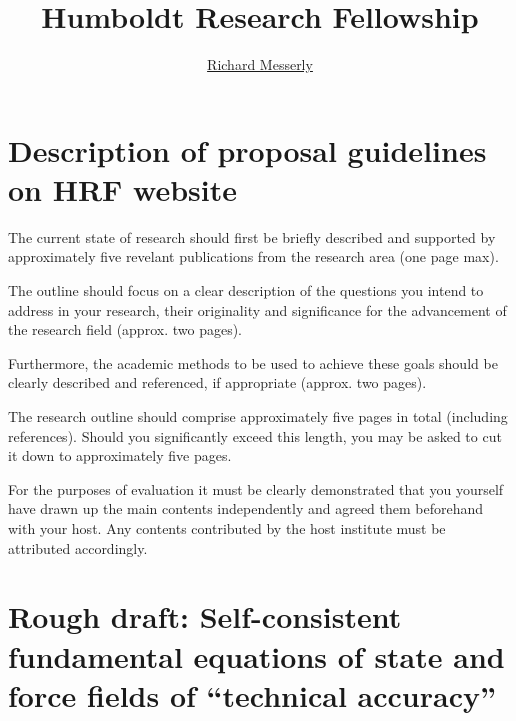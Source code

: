 \documentclass[11pt,a4paper]{article}
\begin{document}
	\thispagestyle{empty}
	\title{\Large \textbf{Humboldt Research Fellowship}}
	\author[1]{\large {\underline{Richard Messerly}}}%
	
	
	\date{} %
	\maketitle\thispagestyle{empty} %
	\justify

\section*{Description of proposal guidelines on HRF website}

The current state of research should first be briefly described and supported by approximately five revelant publications from the research area (one page max).

The outline should focus on a clear description of the questions you intend to address in your research, their originality and significance for the advancement of the research field (approx. two pages).

Furthermore, the academic methods to be used to achieve these goals should be clearly described and referenced, if appropriate (approx. two pages).

The research outline should comprise approximately five pages in total (including references). Should you significantly exceed this length, you may be asked to cut it down to approximately five pages.

For the purposes of evaluation it must be clearly demonstrated that you yourself have drawn up the main contents independently and agreed them beforehand with your host. Any contents contributed by the host institute must be attributed accordingly.

\section*{Rough draft: Self-consistent fundamental equations of state and force fields of ``technical accuracy''}
\end{document}
